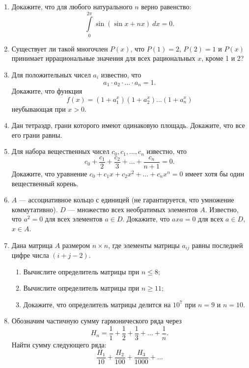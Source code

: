 \begin{enumerate}
\item Докажите, что для любого натурального $n$ верно равенство:
$$\int\limits_0^{2\pi} {\sin(\sin x + nx)}~dx = 0.$$

\item Существует ли такой многочлен $P(x)$, что $P(1) = 2$, $P(2) = 1$ и $P(x)$ принимает иррациональные значения для всех рациональных $x$, кроме 1 и 2? 

\item Для положительных чисел $a_i$ известно, что 
$$a_1 \cdot a_2 \cdot \ldots \cdot a_n = 1.$$ 
Докажите, что функция 
$$f(x) = (1 + a_1^x)(1 + a_2^x) \dots (1 + a_n^x)$$
неубывающая при $x > 0$.

\item Дан тетраэдр, грани которого имеют одинаковую площадь. Докажите, что все его грани равны.

\item Для набора вещественных чисел $c_0, c_1, \dots, c_n$ известно, что 
$$c_0 + \frac{c_1}{2} + \frac{c_2}{3} + \ldots + \frac{c_n}{n+1} = 0.$$
Докажите, что уравнение $c_0 + c_1 x + c_2 x^2 + \ldots + c_n x^n = 0$ имеет хотя бы один вещественный корень. 

\item $A$ --- ассоциативное кольцо с единицей (не гарантируется, что умножение коммутативно). $D$ --- множество всех необратимых элементов $A$. Известно, что $a^2 = 0$ для всех элементов $a \in D$. Докажите, что $axa = 0$ для всех $a \in D$, $x \in A$.

\item Дана матрица $A$ размером $n \times n$, где элементы матрицы $a_{ij}$ равны последней цифре числа $(i+j-2)$. 
\begin{enumerate}
\item Вычислите определитель матрицы при $n \leqslant 8$;
\item Вычислите определитель матрицы при $n \geqslant 11$;
\item Докажите, что определитель матрицы делится на $10^7$ при $n = 9$ и $n = 10$.
\end{enumerate}

\item Обозначим частичную сумму гармонического ряда через 
$$H_n = \frac{1}{1} + \frac{1}{2} + \frac{1}{3} + \ldots + \frac{1}{n}.$$ 
Найти сумму следующего ряда:
$$\frac{H_1}{10} + \frac{H_2}{100} + \frac{H_3}{1000} + \ldots$$
\end{enumerate}